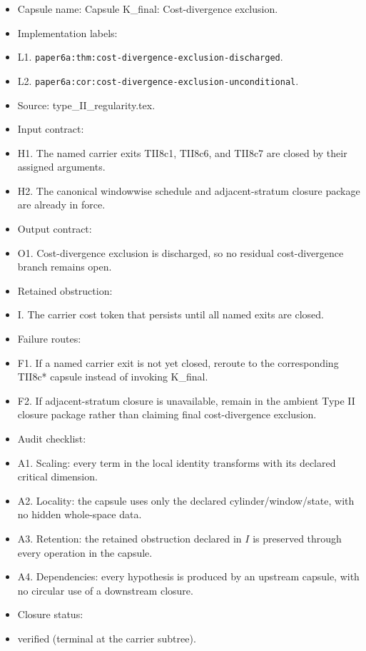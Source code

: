 \documentclass[11pt]{amsart}
\begin{document}
\begin{itemize}
  \item Capsule name: Capsule K\_final: Cost-divergence exclusion.
  \item Implementation labels:
  \item L1. \texttt{paper6a:thm:cost-divergence-exclusion-discharged}.
  \item L2. \texttt{paper6a:cor:cost-divergence-exclusion-unconditional}.
  \item Source: type\_II\_regularity.tex.
  \item Input contract:
  \item H1. The named carrier exits TII8c1, TII8c6, and TII8c7 are closed by their assigned arguments.
  \item H2. The canonical windowwise schedule and adjacent-stratum closure package are already in force.
  \item Output contract:
  \item O1. Cost-divergence exclusion is discharged, so no residual cost-divergence branch remains open.
  \item Retained obstruction:
  \item I. The carrier cost token that persists until all named exits are closed.
  \item Failure routes:
  \item F1. If a named carrier exit is not yet closed, reroute to the corresponding TII8c* capsule instead of invoking K\_final.
  \item F2. If adjacent-stratum closure is unavailable, remain in the ambient Type II closure package rather than claiming final cost-divergence exclusion.
  \item Audit checklist:
  \item A1. Scaling: every term in the local identity transforms with its declared critical dimension.
  \item A2. Locality: the capsule uses only the declared cylinder/window/state, with no hidden whole-space data.
  \item A3. Retention: the retained obstruction declared in $I$ is preserved through every operation in the capsule.
  \item A4. Dependencies: every hypothesis is produced by an upstream capsule, with no circular use of a downstream closure.
  \item Closure status:
  \item verified (terminal at the carrier subtree).
\end{itemize}
\end{document}

